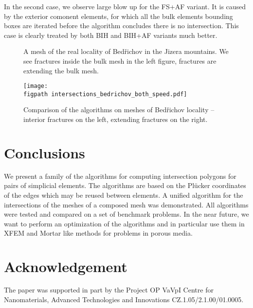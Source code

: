 \documentclass{elsarticle}
\newcommand{\figpath}{figures/}
\newcommand{\plucker}{Pl\"{u}cker }
\begin{document}
In the second case, we observe large blow up for the FS+AF variant. It is caused by the exterior comonent elements, 
for which all the bulk elements bounding boxes are iterated before the algorithm concludes there is no intersection.
This case is clearly treated by both BIH and BIH+AF variants much better.



\begin{figure}[!htb]
    \hspace{3pt}
    \caption{A mesh of the real locality of Bed{\v r}ichov in the Jizera mountains.
             We see fractures inside the bulk mesh in the left figure,
             fractures are extending the bulk mesh.}
    \label{fig:bedrichov_meshes}
\end{figure}

\begin{figure}[!htb]
    \centering
    \texttt{[image: \\figpath intersections\_bedrichov\_both\_speed.pdf]}
    \caption{Comparison of the algorithms on meshes of Bed{\v r}ichov locality -- interior fractures on the left,
             extending fractures on the right.}
    \label{fig:bedrichov_speed}
\end{figure}





\section{Conclusions}
\label{sec:conclusins}
We present a family of the algorithms for computing intersection polygons for pairs of simplicial elements.
The algorithms are based on the \plucker coordinates of the edges which may be reused between elements.
A unified algorithm for the intersections of the meshes of a composed mesh was demonstrated. All algorithms were 
tested and compared on a set of benchmark problems. In the near future, we want to perform an optimization of 
the algorithms and in particular use them in XFEM and Mortar 
like methods for problems in porous media.

\section{Acknowledgement}
The paper was supported in part by the Project OP VaVpI Centre for Nanomaterials, Advanced Technologies  and Innovations
CZ.1.05/2.1.00/01.0005.
\end{document}
